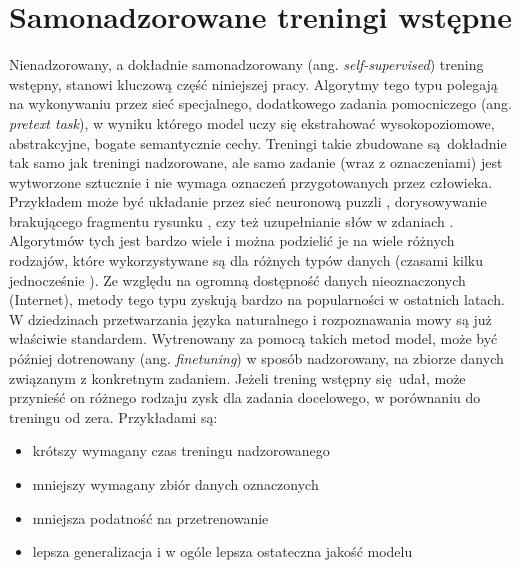 \section{Samonadzorowane treningi wstępne}

Nienadzorowany, a dokładnie samonadzorowany (ang. \emph{self-supervised}) trening wstępny, stanowi kluczową część niniejszej pracy. Algorytmy tego typu polegają na wykonywaniu przez sieć specjalnego, dodatkowego zadania pomocniczego (ang. \emph{pretext task}), w wyniku którego model uczy się ekstrahować wysokopoziomowe, abstrakcyjne, bogate semantycznie cechy. Treningi takie zbudowane są dokładnie tak samo jak treningi nadzorowane, ale samo zadanie (wraz z oznaczeniami) jest wytworzone sztucznie i nie wymaga oznaczeń przygotowanych przez człowieka. Przykładem może być układanie przez sieć neuronową puzzli \cite{noroozi_unsupervised_2017}, dorysowywanie brakującego fragmentu rysunku \cite{pathak_context_2016}, czy też uzupełnianie słów w zdaniach \cite{devlin_bert_2019}. Algorytmów tych jest bardzo wiele i można podzielić je na wiele różnych rodzajów, które wykorzystywane są dla różnych typów danych (czasami kilku jednocześnie \cite{jia_scaling_2021}). Ze względu na ogromną dostępność danych nieoznaczonych (Internet), metody tego typu zyskują bardzo na popularności w ostatnich latach. W dziedzinach przetwarzania języka naturalnego i rozpoznawania mowy są już właściwie standardem. Wytrenowany za pomocą takich metod model, może być później dotrenowany (ang. \emph{finetuning}) w sposób nadzorowany, na zbiorze danych związanym z konkretnym zadaniem. Jeżeli trening wstępny się udał, może przynieść on różnego rodzaju zysk dla zadania docelowego, w porównaniu do treningu od zera. Przykładami są:
\begin{itemize}
    \item krótszy wymagany czas treningu nadzorowanego
    \item mniejszy wymagany zbiór danych oznaczonych
    \item mniejsza podatność na przetrenowanie
    \item lepsza generalizacja i w ogóle lepsza ostateczna jakość modelu
\end{itemize}


